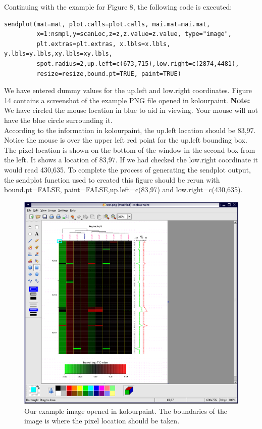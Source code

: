 \documentclass[]{article}
\begin{document}
\indent Continuing with the example for Figure 8, the following code is executed:
\begin{verbatim}
sendplot(mat=mat, plot.calls=plot.calls, mai.mat=mai.mat,
         x=1:nsmpl,y=scanLoc,z=z,z.value=z.value, type="image",
         plt.extras=plt.extras, x.lbls=x.lbls, y.lbls=y.lbls,xy.lbls=xy.lbls, 
         spot.radius=2,up.left=c(673,715),low.right=c(2874,4481),
         resize=resize,bound.pt=TRUE, paint=TRUE)
\end{verbatim}
We have entered dummy values for the up.left and low.right coordinates. Figure 14 contains a screenshot of the example PNG file opened in kolourpaint. {\bf{Note:}} We have circled the mouse location in blue to aid in viewing. Your mouse will not have the blue circle surrounding it.\\ \indent  According to the information in kolourpaint, the up.left location should be 83,97. Notice the mouse is over the upper left red point for the up.left bounding box. The pixel location is shown on the bottom of the window in the second box from the left. It shows a location of 83,97. If we had checked the low.right coordinate it would read 430,635. To complete the process of generating the sendplot output, the sendplot function used to created this figure should be rerun with bound.pt=FALSE, paint=FALSE,up.left=c(83,97) and low.right=c(430,635). \newline

\begin{center}
\begin{figure}
\includegraphics{sendPlot3}
\caption{Our example image opened in kolourpaint. The boundaries of the image is where the pixel location should be taken.}
\end{figure}
\end{center}
\end{document}
